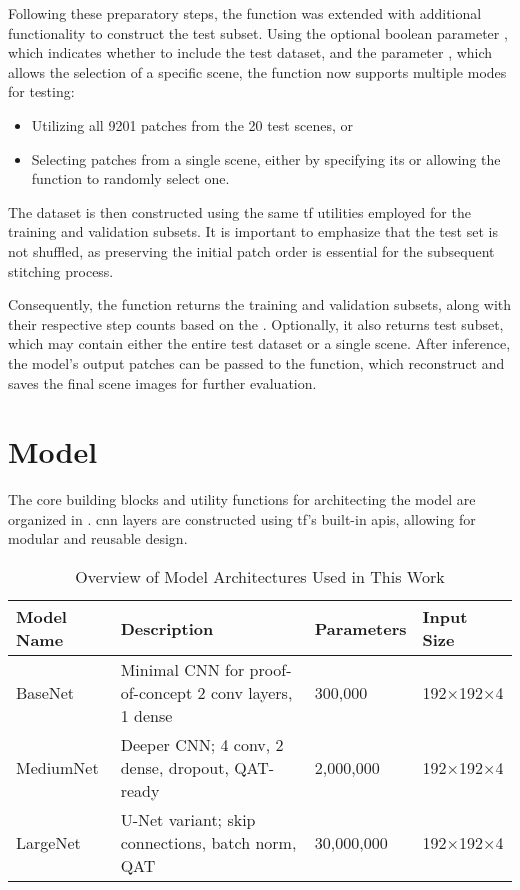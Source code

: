 {Following these preparatory steps, the  function was extended with additional functionality to construct the test subset.
Using the optional boolean parameter , which indicates whether to include the test dataset, and the parameter ,
which allows the selection of a specific scene, the function now supports multiple modes for testing:

\begin{itemize}
    \item Utilizing all 9201 patches from the 20 test scenes, or
    \item Selecting patches from a single scene, either by specifying its  or allowing the function to randomly select one.
\end{itemize}

The dataset is then constructed using the same \gls{tf} utilities employed for the training and validation subsets.
It is important to emphasize that the test set is not shuffled, as preserving the initial patch order is essential for the subsequent stitching process.

Consequently, the  function returns the training and validation subsets, along with their respective step counts based on the .
Optionally, it also returns test subset, which may contain either the entire test dataset or a single scene.
After inference, the model's output patches can be passed to the  function, which reconstruct and saves the final scene images for further evaluation.

\section{Model}
\label{sec:model}

The core building blocks and utility functions for architecting the model are organized in .
\gls{cnn} layers are constructed using \gls{tf}'s built-in \glspl{api}, allowing for modular and reusable design.

\begin{table}[H]
\centering
\begin{tabularx}{\textwidth}{l X l l}
\textbf{Model Name} & \textbf{Description} & \textbf{Parameters} & \textbf{Input Size} \\
\hline
BaseNet      & Minimal CNN for proof-of-concept 2 conv layers, 1 dense & 300,000 & 192×192×4 \\
MediumNet    & Deeper CNN; 4 conv, 2 dense, dropout, QAT-ready          & 2,000,000 & 192×192×4 \\
LargeNet     & U-Net variant; skip connections, batch norm, QAT         & 30,000,000 & 192×192×4 \\
\end{tabularx}
\caption{Overview of Model Architectures Used in This Work}
\label{tab:model-architectures}
\end{table}


}
